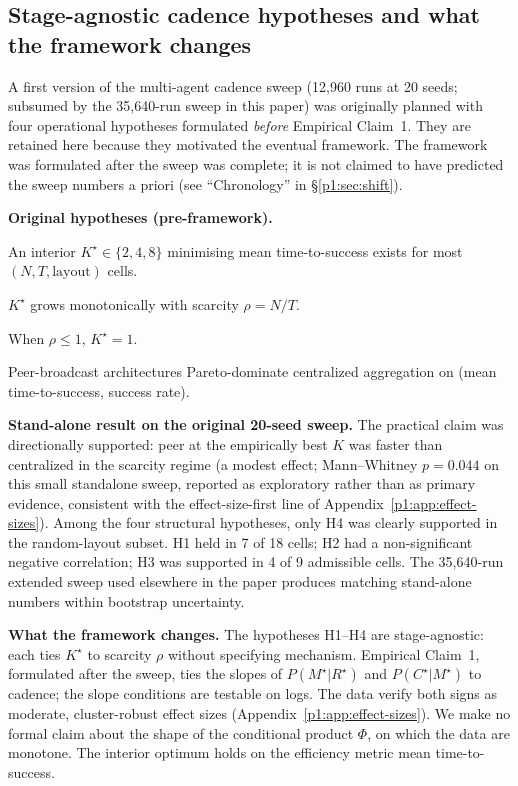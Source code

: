 \documentclass{article}
\begin{document}
\subsection{Stage-agnostic cadence hypotheses and what the framework changes}
\label{p1:app:standalone-hypotheses}

A first version of the multi-agent cadence sweep (12{,}960 runs at 20 seeds; subsumed by the 35{,}640-run sweep in this paper) was originally planned with four operational hypotheses formulated \emph{before} Empirical Claim~1. They are retained here because they motivated the eventual framework. The framework was formulated after the sweep was complete; it is not claimed to have predicted the sweep numbers a priori (see ``Chronology'' in \S\ref{p1:sec:shift}).

\textbf{Original hypotheses (pre-framework).}
\begin{description}[leftmargin=10pt,topsep=2pt,itemsep=1pt]
\item[H1.] An interior $K^\star \in \{2,4,8\}$ minimising mean time-to-success exists for most $(N, T, \text{layout})$ cells.
\item[H2.] $K^\star$ grows monotonically with scarcity $\rho = N/T$.
\item[H3.] When $\rho \le 1$, $K^\star = 1$.
\item[H4.] Peer-broadcast architectures Pareto-dominate centralized aggregation on (mean time-to-success, success rate).
\end{description}

\textbf{Stand-alone result on the original 20-seed sweep.}
The practical claim was directionally supported: peer at the empirically best $K$ was faster than centralized in the scarcity regime (a modest effect; Mann--Whitney $p{=}0.044$ on this small standalone sweep, reported as exploratory rather than as primary evidence, consistent with the effect-size-first line of Appendix~\ref{p1:app:effect-sizes}). Among the four structural hypotheses, only H4 was clearly supported in the random-layout subset. H1 held in 7 of 18 cells; H2 had a non-significant negative correlation; H3 was supported in 4 of 9 admissible cells. The 35{,}640-run extended sweep used elsewhere in the paper produces matching stand-alone numbers within bootstrap uncertainty.

\textbf{What the framework changes.}
The hypotheses H1--H4 are stage-agnostic: each ties $K^\star$ to scarcity $\rho$ without specifying mechanism. Empirical Claim~1, formulated after the sweep, ties the slopes of $P(M^\star|R^\star)$ and $P(C^\star|M^\star)$ to cadence; the slope conditions are testable on logs. The data verify both signs as moderate, cluster-robust effect sizes (Appendix~\ref{p1:app:effect-sizes}). We make no formal claim about the shape of the conditional product $\Phi$, on which the data are monotone. The interior optimum holds on the efficiency metric mean time-to-success.
\end{document}
